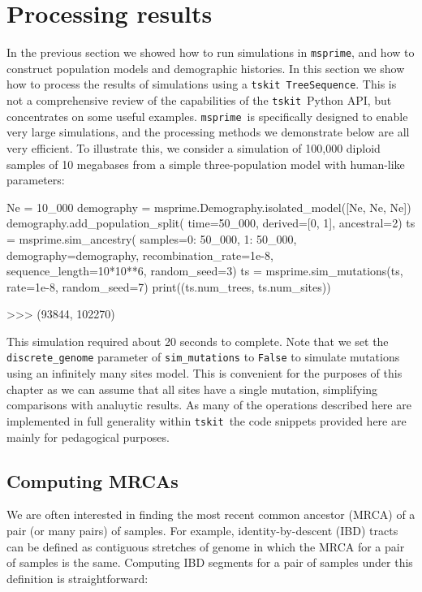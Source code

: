 \documentclass[graybox]{svmult}
\newcommand{\msprime}[0]{\texttt{msprime}}
\newcommand{\tskit}[0]{\texttt{tskit}}
\begin{document}
\section{Processing results}\label{processing-results}

In the previous section we showed how to run simulations in \msprime, and
how to construct population models and demographic histories. In this
section we show how to process the results of simulations using
a \tskit\ \texttt{TreeSequence}. This is not a
comprehensive review of the capabilities of the \tskit\ Python API, but
concentrates on some useful examples.
\msprime\ is specifically designed to enable very large simulations, and
the processing methods we demonstrate below are all very efficient. To
illustrate this, we consider a simulation of 100,000 diploid samples of 10 megabases
from a simple three-population model with human-like parameters:

\begin{pythoncode}
Ne = 10_000
demography = msprime.Demography.isolated_model([Ne, Ne, Ne])
demography.add_population_split(
    time=50_000, derived=[0, 1], ancestral=2)
ts = msprime.sim_ancestry(
    samples={0: 50_000, 1: 50_000},
    demography=demography, recombination_rate=1e-8,
    sequence_length=10*10**6, random_seed=3)
ts = msprime.sim_mutations(ts, rate=1e-8, random_seed=7)
print((ts.num_trees, ts.num_sites))

>>> (93844, 102270)
\end{pythoncode}

This simulation required about 20 seconds to complete. Note that we set the
\texttt{discrete\_genome} parameter of \texttt{sim\_mutations} to
\texttt{False} to simulate mutations using an infinitely many sites model.
This is convenient for the purposes of this chapter as we can assume
that all sites have a single mutation, simplifying comparisons with analuytic results. As many
of the operations described here are implemented in full generality
within \tskit\, the code snippets provided here are mainly for pedagogical
purposes.

\subsection{Computing MRCAs}\label{computing-mrcas}
We are often interested in finding the most recent common ancestor (MRCA)
of a pair (or many pairs) of samples. For example, identity-by-descent
(IBD) tracts can be defined as contiguous stretches of genome in which the
MRCA for a pair of samples is the same. Computing IBD segments for a
pair of samples under this definition is straightforward:
\end{document}
